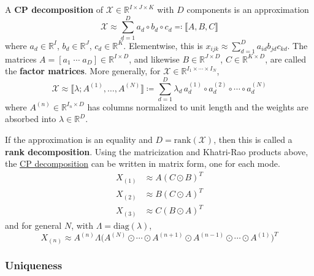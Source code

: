   \begin{definition}[CP Decomposition]
    \label{def:cp-decomposition}
    A \textbf{CP decomposition} of $\mathcal{X} \in \mathbb{R}^{I \times J \times K}$ with $D$ components is an approximation
    \begin{equation}
      \mathcal{X} \approx \sum_{d=1}^D a_d \circ b_d \circ c_d \eqqcolon \llbracket A, B, C \rrbracket
    \end{equation}
    where $a_d \in \mathbb{R}^I$, $b_d \in \mathbb{R}^J$, $c_d \in \mathbb{R}^K$. Elementwise, this is $x_{ijk} \approx \sum_{d=1}^D a_{id} b_{jd} c_{kd}$. The matrices $A = [a_1 \; \cdots \; a_D] \in \mathbb{R}^{I \times D}$, and likewise $B \in \mathbb{R}^{J \times D}$, $C \in \mathbb{R}^{K \times D}$, are called the \textbf{factor matrices}. More generally, for $\mathcal{X} \in \mathbb{R}^{I_1 \times \cdots \times I_N}$,
    \begin{equation}
      \mathcal{X} \approx \llbracket \lambda; A^{(1)}, \ldots, A^{(N)} \rrbracket \coloneqq \sum_{d=1}^D \lambda_d \, a^{(1)}_d \circ a^{(2)}_d \circ \cdots \circ a^{(N)}_d
    \end{equation}
    where $A^{(n)} \in \mathbb{R}^{I_n \times D}$ has columns normalized to unit length and the weights are absorbed into $\lambda \in \mathbb{R}^D$.
  \end{definition}

  If the approximation is an equality and $D = \mathrm{rank}(\mathcal{X})$, then this is called a \textbf{rank decomposition}. Using the matricization and Khatri-Rao products above, the \hyperref[def:cp-decomposition]{CP decomposition} can be written in matrix form, one for each mode.
  \begin{align}
    X_{(1)} & \approx A (C \odot B)^T \\
    X_{(2)} & \approx B (C \odot A)^T \\
    X_{(3)} & \approx C (B \odot A)^T
  \end{align}
  and for general $N$, with $\Lambda = \mathrm{diag}(\lambda)$,
  \begin{equation}
    X_{(n)} \approx A^{(n)} \Lambda \big( A^{(N)} \odot \cdots \odot A^{(n+1)} \odot A^{(n-1)} \odot \cdots \odot A^{(1)} \big)^T
  \end{equation}

  \subsubsection{Uniqueness}

